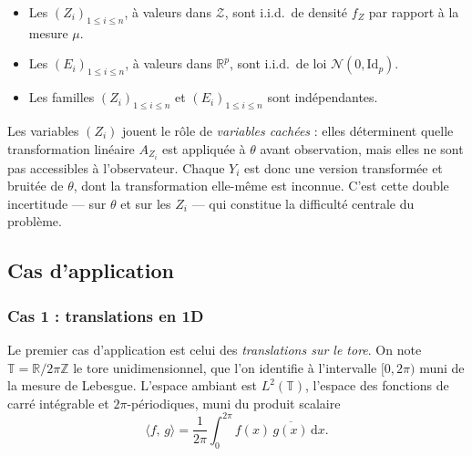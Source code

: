 \documentclass[12pt, a4paper]{article}
\theoremstyle{definition}
\newcommand{\R}{\mathbb{R}}
\newcommand{\Zcal}{\mathcal{Z}}
\newcommand{\Ncal}{\mathcal{N}}
\newcommand{\inner}[2]{\langle #1,\, #2 \rangle}
\begin{document}
\begin{itemize}
    \item Les $(Z_i)_{1 \leq i \leq n}$, à valeurs dans $\Zcal$, sont i.i.d.\
    de densité $f_Z$ par rapport à la mesure $\mu$.
    \item Les $(E_i)_{1 \leq i \leq n}$, à valeurs dans $\R^p$, sont i.i.d.\
    de loi $\Ncal(0, \mathrm{Id}_p)$.
    \item Les familles $(Z_i)_{1 \leq i \leq n}$ et $(E_i)_{1 \leq i \leq n}$
    sont indépendantes.
\end{itemize}

Les variables $(Z_i)$ jouent le rôle de \textit{variables cachées} : elles
déterminent quelle transformation linéaire $A_{Z_i}$ est appliquée à $\theta$
avant observation, mais elles ne sont pas accessibles à l'observateur.
Chaque $Y_i$ est donc une version transformée et bruitée de $\theta$, dont
la transformation elle-même est inconnue. C'est cette double incertitude ---
sur $\theta$ et sur les $Z_i$ --- qui constitue la difficulté centrale du problème.

\subsection{Cas d'application}
\label{subsec:cas_application}

\subsubsection{Cas 1 : translations en 1D}
\label{subsubsec:cas1}

Le premier cas d'application est celui des \textit{translations sur le tore}.
On note $\mathbb{T} = \mathbb{R} / 2\pi\mathbb{Z}$ le tore unidimensionnel,
que l'on identifie à l'intervalle $[0, 2\pi)$ muni de la mesure de Lebesgue.
L'espace ambiant est $L^2(\mathbb{T})$, l'espace des fonctions de carré intégrable
et $2\pi$-périodiques, muni du produit scalaire
\[
    \inner{f}{g} = \frac{1}{2\pi} \int_0^{2\pi} f(x)\,\overline{g(x)}\,\mathrm{d}x.
\]
\end{document}
